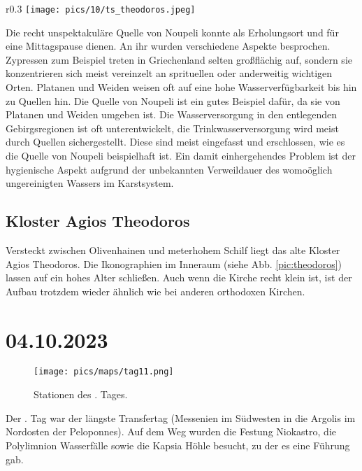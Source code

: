 \documentclass[preprint]{geomorphica} %
\begin{document}
\begin{wrapfigure}{r}{0.3\textwidth}
    \vspace{-15mm}
    \centering
    \texttt{[image: pics/10/ts\_theodoros.jpeg]}
    \caption{Ikonographien des Zentralbaus des Klosters Agios Theodoros [Foto: Tabea Storch].}
    \label{pic:theodoros}
\end{wrapfigure}

Die recht unspektakuläre Quelle von Noupeli konnte als Erholungsort und für eine Mittagspause dienen. An ihr wurden verschiedene Aspekte besprochen. Zypressen zum Beispiel treten in Griechenland selten großflächig auf, sondern sie konzentrieren sich meist vereinzelt an sprituellen oder anderweitig wichtigen Orten. Platanen und Weiden weisen oft auf eine hohe Wasserverfügbarkeit bis hin zu Quellen hin. Die Quelle von Noupeli ist ein gutes Beispiel dafür, da sie von Platanen und Weiden umgeben ist. Die Wasserversorgung in den entlegenden Gebirgsregionen ist oft unterentwickelt, die Trinkwasserversorgung wird meist durch Quellen sichergestellt. Diese sind meist eingefasst und erschlossen, wie es die Quelle von Noupeli beispielhaft ist. Ein damit einhergehendes Problem ist der hygienische Aspekt aufgrund der unbekannten Verweildauer des womoöglich ungereinigten Wassers im Karstsystem.   

\subsection{Kloster Agios Theodoros}

Versteckt zwischen Olivenhainen und meterhohem Schilf liegt das alte Kloster Agios Theodoros. Die Ikonographien im Inneraum (siehe Abb. \ref{pic:theodoros}) lassen auf ein hohes Alter schließen. Auch wenn die Kirche recht klein ist, ist der Aufbau trotzdem wieder ähnlich wie bei anderen orthodoxen Kirchen.


\section{04.10.2023}

\begin{figure}[!h]
    \centering
    \texttt{[image: pics/maps/tag11.png]}
    \caption{Stationen des \theday. Tages.}
    \label{pic:tag11}
\end{figure}

Der \theday. Tag war der längste Transfertag (Messenien im Südwesten in die Argolis im Nordosten der Peloponnes). Auf dem Weg wurden die Festung Niokastro, die Polylimnion Wasserfälle sowie die Kapsia Höhle besucht, zu der es eine Führung gab.
\end{document}
